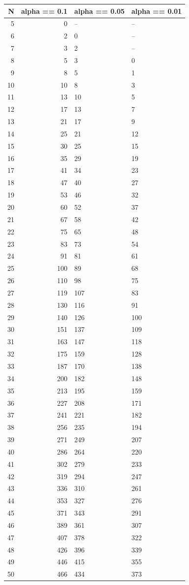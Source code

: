 \documentclass[
]{scrbook}
\begin{document}
\begin{tabular}{r|r|l|l}
\hline
N & alpha == 0.1 & alpha == 0.05 & alpha == 0.01\\
\hline
5 & 0 & -- & --\\
\hline
6 & 2 & 0 & --\\
\hline
7 & 3 & 2 & --\\
\hline
8 & 5 & 3 & 0\\
\hline
9 & 8 & 5 & 1\\
\hline
10 & 10 & 8 & 3\\
\hline
11 & 13 & 10 & 5\\
\hline
12 & 17 & 13 & 7\\
\hline
13 & 21 & 17 & 9\\
\hline
14 & 25 & 21 & 12\\
\hline
15 & 30 & 25 & 15\\
\hline
16 & 35 & 29 & 19\\
\hline
17 & 41 & 34 & 23\\
\hline
18 & 47 & 40 & 27\\
\hline
19 & 53 & 46 & 32\\
\hline
20 & 60 & 52 & 37\\
\hline
21 & 67 & 58 & 42\\
\hline
22 & 75 & 65 & 48\\
\hline
23 & 83 & 73 & 54\\
\hline
24 & 91 & 81 & 61\\
\hline
25 & 100 & 89 & 68\\
\hline
26 & 110 & 98 & 75\\
\hline
27 & 119 & 107 & 83\\
\hline
28 & 130 & 116 & 91\\
\hline
29 & 140 & 126 & 100\\
\hline
30 & 151 & 137 & 109\\
\hline
31 & 163 & 147 & 118\\
\hline
32 & 175 & 159 & 128\\
\hline
33 & 187 & 170 & 138\\
\hline
34 & 200 & 182 & 148\\
\hline
35 & 213 & 195 & 159\\
\hline
36 & 227 & 208 & 171\\
\hline
37 & 241 & 221 & 182\\
\hline
38 & 256 & 235 & 194\\
\hline
39 & 271 & 249 & 207\\
\hline
40 & 286 & 264 & 220\\
\hline
41 & 302 & 279 & 233\\
\hline
42 & 319 & 294 & 247\\
\hline
43 & 336 & 310 & 261\\
\hline
44 & 353 & 327 & 276\\
\hline
45 & 371 & 343 & 291\\
\hline
46 & 389 & 361 & 307\\
\hline
47 & 407 & 378 & 322\\
\hline
48 & 426 & 396 & 339\\
\hline
49 & 446 & 415 & 355\\
\hline
50 & 466 & 434 & 373\\
\hline
\end{tabular}
\end{document}
